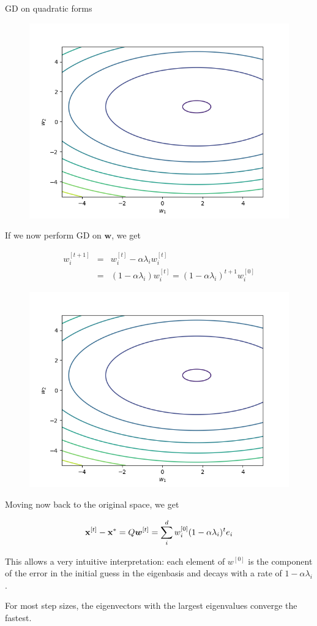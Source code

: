 \documentclass[11pt,compress,t,notes=noshow, xcolor=table]{beamer}
\begin{document}
\begin{vbframe}{GD on quadratic forms}
\begin{figure}
	\includegraphics[height=0.35\textwidth, keepaspectratio]{figure_man/gd_eigenspace.png} \\
\end{figure}
\framebreak
If we now perform GD on $\boldsymbol{w}$, we get

\begin{eqnarray*}
	w_i^{[ t+1 ] } &=& w_i^{[ t ] } - \alpha \lambda_i w_i^{[ t ] } \\
	&=& (1- \alpha \lambda_i) w_i^{[ t ] } = (1- \alpha \lambda_i)^{t+1 } w_i^{[ 0 ] }
\end{eqnarray*}

\begin{figure}
	\includegraphics[height=0.35\textwidth, keepaspectratio]{figure_man/gd_eigenspace.png} \\
\end{figure}

\framebreak

Moving now back to the original space, we get

$$
	\mathbf{x}^{[ t ] } - \mathbf{x}^\ast = Q \boldsymbol{w}^{[ t ] } = \sum_{i}^{d} w_i^{[0]} ( 1 - \alpha \lambda_i)^t e_i 
$$

This allows a very intuitive interpretation: each element of $w^{[0]}$ is the component of the error in the initial guess in the eigenbasis and decays with a rate of $1 - \alpha \lambda_i$. 

For most step sizes, the eigenvectors with the largest eigenvalues converge the fastest. 

\framebreak


\end{vbframe}
\end{document}
